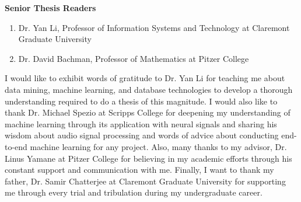 \doublespacing
\setlength{\parindent}{1cm}

\begin{center}
  \textbf{Senior Thesis Readers} \par
  \begin{enumerate}
    \item Dr. Yan Li, Professor of Information Systems and Technology at Claremont Graduate University
    \item Dr. David Bachman, Professor of Mathematics at Pitzer College
  \end{enumerate}
\end{center}

\par

I would like to exhibit words of gratitude to Dr. Yan Li for teaching me about data mining, machine learning, and database technologies to develop a thorough understanding required to do a thesis of this magnitude. I would also like to thank Dr. Michael Spezio at Scripps College for deepening my understanding of machine learning through its application with neural signals and sharing his wisdom about audio signal processing and words of advice about conducting end-to-end machine learning for any project. Also, many thanks to my advisor, Dr. Linus Yamane at Pitzer College for believing in my academic efforts through his constant support and communication with me. Finally, I want to thank my father, Dr. Samir Chatterjee at Claremont Graduate University for supporting me through every trial and tribulation during my undergraduate career.
